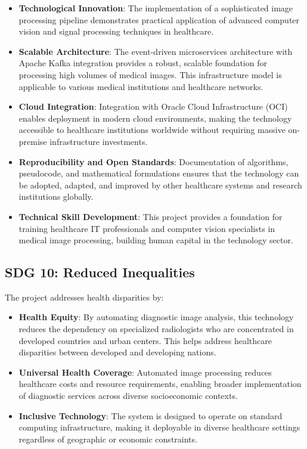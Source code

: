 \documentclass[12pt,a4paper]{article}
\begin{document}
\begin{itemize}
    \item \textbf{Technological Innovation}: The implementation of a sophisticated image processing pipeline demonstrates practical application of advanced computer vision and signal processing techniques in healthcare.
    
    \item \textbf{Scalable Architecture}: The event-driven microservices architecture with Apache Kafka integration provides a robust, scalable foundation for processing high volumes of medical images. This infrastructure model is applicable to various medical institutions and healthcare networks.
    
    \item \textbf{Cloud Integration}: Integration with Oracle Cloud Infrastructure (OCI) enables deployment in modern cloud environments, making the technology accessible to healthcare institutions worldwide without requiring massive on-premise infrastructure investments.
    
    \item \textbf{Reproducibility and Open Standards}: Documentation of algorithms, pseudocode, and mathematical formulations ensures that the technology can be adopted, adapted, and improved by other healthcare systems and research institutions globally.
    
    \item \textbf{Technical Skill Development}: This project provides a foundation for training healthcare IT professionals and computer vision specialists in medical image processing, building human capital in the technology sector.
\end{itemize}

\subsection{SDG 10: Reduced Inequalities}

The project addresses health disparities by:

\begin{itemize}
    \item \textbf{Health Equity}: By automating diagnostic image analysis, this technology reduces the dependency on specialized radiologists who are concentrated in developed countries and urban centers. This helps address healthcare disparities between developed and developing nations.
    
    \item \textbf{Universal Health Coverage}: Automated image processing reduces healthcare costs and resource requirements, enabling broader implementation of diagnostic services across diverse socioeconomic contexts.
    
    \item \textbf{Inclusive Technology}: The system is designed to operate on standard computing infrastructure, making it deployable in diverse healthcare settings regardless of geographic or economic constraints.
\end{itemize}
\end{document}
